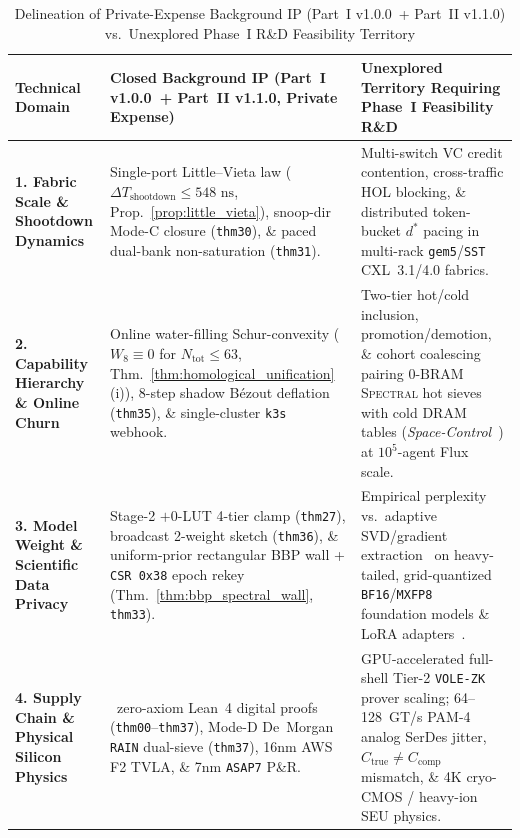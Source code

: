 \documentclass[10pt,twocolumn]{article}
\providecommand{\ReleaseVersion}{v1.1.0}
\providecommand{\BaselineVersion}{v1.0.0}
\providecommand{\LeanCumulativeTotal}{38}
\theoremstyle{spectralthm}
\begin{document}
\begin{table}[!tp]
\centering
\footnotesize
\setlength{\tabcolsep}{5.0pt}
\renewcommand{\arraystretch}{1.19}
\caption{Delineation of Private-Expense Background IP (Part~I \BaselineVersion\ + Part~II \ReleaseVersion) vs.\ Unexplored Phase~I R\&D Feasibility Territory}
\label{tab:phase1_frontier}
\begin{tabularx}{\textwidth}{@{}>{\raggedright\hyphenpenalty=10000\arraybackslash}p{3.15cm} >{\raggedright\arraybackslash}p{5.55cm} >{\raggedright\arraybackslash}X@{}}
\toprule
\textbf{Technical Domain} & \textbf{Closed Background IP (Part~I \BaselineVersion\ + Part~II \ReleaseVersion, Private Expense)} & \textbf{Unexplored Territory Requiring Phase~I Feasibility R\&D} \\
\midrule
\textbf{1. Fabric Scale \& Shootdown Dynamics} & Single-port Little--Vieta law ($\Delta T_{\mathrm{shootdown}} \le 548\text{~ns}$, Prop.~\ref{prop:little_vieta}), snoop-dir Mode-C closure (\texttt{thm30}), \& paced dual-bank non-saturation (\texttt{thm31}). & Multi-switch VC credit contention, cross-traffic HOL blocking, \& distributed token-bucket $d^*$ pacing in multi-rack \texttt{gem5}/\texttt{SST} CXL~3.1/4.0 fabrics. \\
\textbf{2. Capability Hierarchy \& Online Churn} & Online water-filling Schur-convexity ($W_8 \equiv 0$ for $N_{\mathrm{tot}}\le 63$, Thm.~\ref{thm:homological_unification}(i)), 8-step shadow B\'{e}zout deflation (\texttt{thm35}), \& single-cluster \texttt{k3s} webhook. & Two-tier hot/cold inclusion, promotion/demotion, \& cohort coalescing pairing $0\text{-BRAM}$ \textsc{Spectral} hot sieves with cold DRAM tables (\textit{Space-Control}~\cite{goswami2026spacecontrol}) at $10^5$-agent Flux scale. \\
\textbf{3. Model Weight \& Scientific Data Privacy} & Stage-2 $+0$-LUT 4-tier clamp (\texttt{thm27}), broadcast 2-weight sketch (\texttt{thm36}), \& uniform-prior rectangular BBP wall + \texttt{CSR 0x38} epoch rekey (Thm.~\ref{thm:bbp_spectral_wall}, \texttt{thm33}). & Empirical perplexity vs.\ adaptive SVD/gradient extraction~\cite{carlini2024stealing} on heavy-tailed, grid-quantized \texttt{BF16}/\texttt{MXFP8}~\cite{rouhani2023microscaling} foundation models \& LoRA adapters~\cite{hu2022lora}. \\
\textbf{4. Supply Chain \& Physical Silicon Physics} & \LeanCumulativeTotal\ zero-axiom Lean~4 digital proofs (\texttt{thm00}--\texttt{thm37}), Mode-D De~Morgan \texttt{RAIN} dual-sieve (\texttt{thm37}), 16nm AWS F2 TVLA, \& 7nm \texttt{ASAP7} P\&R. & GPU-accelerated full-shell Tier-2 \texttt{VOLE-ZK} prover scaling; 64--128~GT/s PAM-4 analog SerDes jitter, $C_{\mathrm{true}}\neq C_{\mathrm{comp}}$ mismatch, \& 4K cryo-CMOS / heavy-ion SEU physics. \\
\bottomrule
\end{tabularx}
\end{table}
\end{document}

